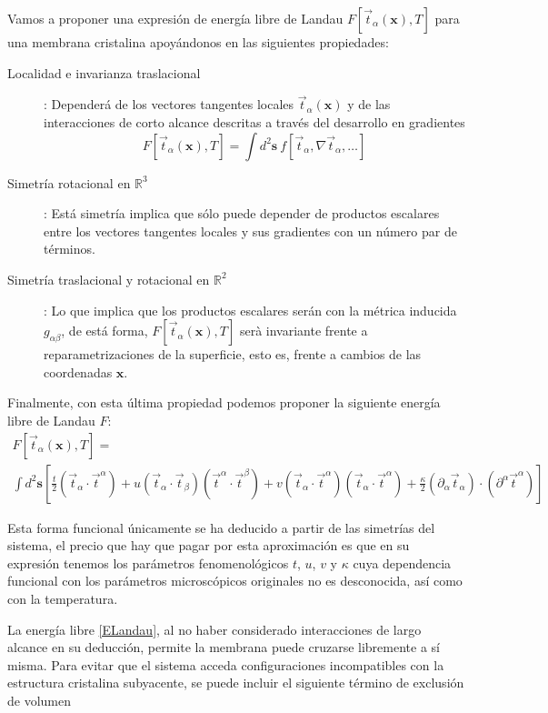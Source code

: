 Vamos a proponer una expresión de energía libre de Landau
$F[\vec{t}_{\alpha}(\mathbf{x}),T]$ para una membrana cristalina
apoyándonos en las siguientes propiedades:
\begin{description}
\item[Localidad e invarianza traslacional]: Dependerá de los vectores
  tangentes locales $\vec{t}_{\alpha}(\mathbf{x})$ y de las
  interacciones de corto alcance descritas a través del desarrollo en gradientes
  $$ F[\vec{t}_{\alpha}(\mathbf{x}),T]=\int\! d^2\mathbf{s}\ f[\vec{t}_{\alpha},\nabla
  \vec{t}_{\alpha},\dots]$$ 
\item[Simetría rotacional en $\mathbb{R}^3$]: Está simetría implica que sólo
  puede depender de productos escalares entre los vectores tangentes
  locales y sus gradientes con un número par de términos. 

\item[Simetría traslacional y rotacional en $\mathbb{R}^2$]: Lo que implica
  que los productos escalares serán con la métrica inducida $g_{\alpha\beta}$,
  de está forma, $F[\vec{t}_{\alpha}(\mathbf{x}),T]$ serà invariante frente a
  reparametrizaciones de la superficie, esto es, frente a cambios de 
  las coordenadas $\mathbf{x}$.
\end{description}

 Finalmente, con esta última propiedad podemos proponer la siguiente energía libre de Landau $F$:
  \begin{multline}\label{ELandau}
    F[\vec{t}_{\alpha}(\mathbf{x}),T]=\\
\int d^2\mathbf{s}
    \left[
      \frac{t}{2}(\vec{t}_{\alpha}\cdot\vec{t}^{\alpha})+
      u(\vec{t}_{\alpha}\cdot\vec{t}_{\beta})(\vec{t}^{\alpha}\cdot\vec{t}^{\beta})+
      v(\vec{t}_{\alpha}\cdot\vec{t}^{\alpha})(\vec{t}_{\alpha}\cdot\vec{t}^{\alpha})+
      \frac{\kappa}{2}(\partial_{\alpha}\vec{t}_{\alpha})\cdot(\partial^{\alpha}\vec{t}^{\alpha}) \right]
  \end{multline}


Esta forma funcional únicamente se ha deducido a partir de las simetrías del
sistema, el precio que hay que pagar por esta aproximación es que en su
expresión tenemos los parámetros fenomenológicos $t$, $u$, $v$ y $\kappa$ cuya
dependencia funcional con los parámetros microscópicos originales no es
desconocida, así como con la temperatura.


La energía libre \eqref{ELandau}, al no haber considerado
interacciones de largo alcance en su deducción, permite la membrana puede
cruzarse libremente a sí misma. Para evitar que el sistema acceda
configuraciones incompatibles con la estructura cristalina subyacente, se
puede incluir el siguiente término de exclusión de volumen

